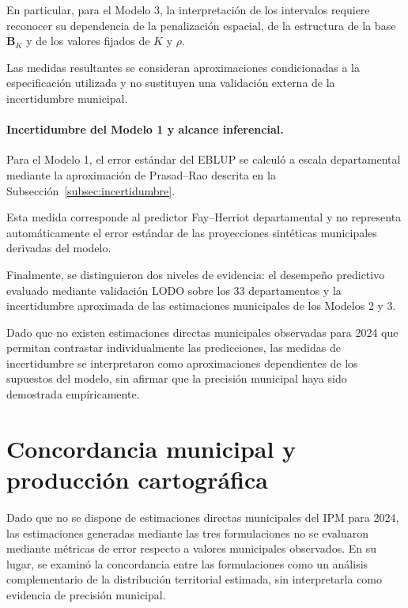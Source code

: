 En particular, para el Modelo 3, la interpretación de los intervalos requiere reconocer su dependencia de la penalización espacial, de la estructura de la base $\mathbf{B}_K$ y de los valores fijados de $K$ y $\rho$.

Las medidas resultantes se consideran aproximaciones condicionadas a la especificación utilizada y no sustituyen una validación externa de la incertidumbre municipal.

\paragraph{Incertidumbre del Modelo 1 y alcance inferencial.}

Para el Modelo 1, el error estándar del EBLUP se calculó a escala departamental mediante la aproximación de Prasad--Rao descrita en la Subsección~\ref{subsec:incertidumbre}.

Esta medida corresponde al predictor Fay--Herriot departamental y no representa automáticamente el error estándar de las proyecciones sintéticas municipales derivadas del modelo.

Finalmente, se distinguieron dos niveles de evidencia: el desempeño predictivo evaluado mediante validación LODO sobre los 33 departamentos y la incertidumbre aproximada de las estimaciones municipales de los Modelos 2 y 3.

Dado que no existen estimaciones directas municipales observadas para 2024 que permitan contrastar individualmente las predicciones, las medidas de incertidumbre se interpretaron como aproximaciones dependientes de los supuestos del modelo, sin afirmar que la precisión municipal haya sido demostrada empíricamente.


\section{Concordancia municipal y producción cartográfica}
\label{sec:met-cartografia}

Dado que no se dispone de estimaciones directas municipales del IPM para 2024, las estimaciones generadas mediante las tres formulaciones no se evaluaron mediante métricas de error respecto a valores municipales observados. En su lugar, se examinó la concordancia entre las formulaciones como un análisis complementario de la distribución territorial estimada, sin interpretarla como evidencia de precisión municipal.

